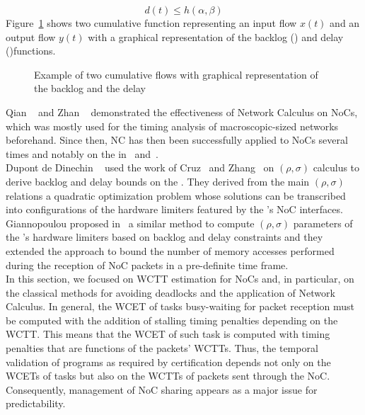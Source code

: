 \documentclass[main.tex]{subfiles}
\begin{document}
\begin{equation}
    \label{eq_stateOftheArt_NCdelay}
    d(t)  \leq h( \alpha , \beta )
\end{equation}
Figure~\ref{fig_stateOfTheArt_NCcumulCurves} shows two cumulative function
representing an input flow $x(t)$ and an output flow  $y(t)$ with a graphical
representation of the backlog () and delay ()functions.

\begin{figure}
    \centering
    \scalebox{1.3}{}
    \caption{Example of two cumulative flows with graphical representation of
    the backlog and the delay}
    \label{fig_stateOfTheArt_NCcumulCurves}
\end{figure}


Qian \etal~\cite{Qian2009, Qian2010} and Zhan \etal~\cite{Zhan2013}
demonstrated the effectiveness of Network Calculus on NoCs, which was mostly
used for the timing analysis of macroscopic-sized networks beforehand. Since
then, NC has then been successfully applied to NoCs several times and notably
on the \mppalong in~\cite{Dinechin2014} and~\cite{Giannopoulou2015}. \\

Dupont de Dinechin \etal~\cite{Dinechin2014} used the work of
Cruz~\cite{Cruz91} and Zhang~\cite{Zhang1995} on $(\rho , \sigma)$ calculus to
derive backlog and delay bounds on the \mppalong. They derived from the main
$(\rho , \sigma)$ relations a quadratic optimization problem whose solutions
can be transcribed into configurations of the hardware limiters featured by the
\mppalong's NoC interfaces. Giannopoulou \etal proposed
in~\cite{Giannopoulou2015} a similar method to compute $(\rho , \sigma)$
parameters of the \mppalong's hardware limiters based on backlog and delay
constraints and they extended the approach to bound the number of memory
accesses performed during the reception of NoC packets in a pre-definite time
frame. \\

In this section, we focused on WCTT estimation for NoCs and, in particular, on
the classical methods for avoiding deadlocks and the application of Network
Calculus. In general, the WCET of tasks busy-waiting for packet reception must
be computed with the addition of stalling timing penalties depending on the
WCTT. This means that the WCET of such task is computed with timing penalties
that are functions of the packets' WCTTs. Thus, the temporal validation of
programs as required by certification depends not only on the WCETs of tasks
but also on the WCTTs of packets sent through the NoC. Consequently, management
of NoC sharing appears as a major issue for predictability. \\
\end{document}
